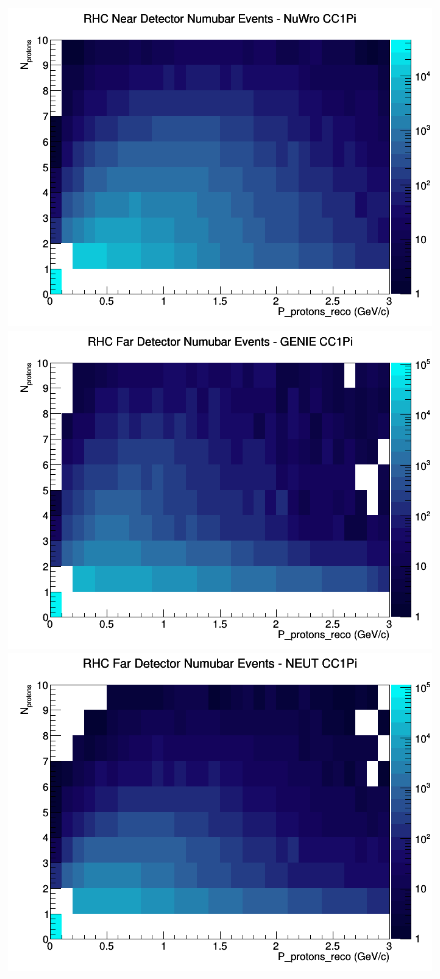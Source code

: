 \begin{figure}[h]
\includegraphics[width=\linewidth]{eff_N_P/LAr/protons/CC1Pi_RHC_ND_numubar_N_P_NuWro.png}
\endminipage
\newline
{}
\includegraphics[width=\linewidth]{eff_N_P/LAr/protons/CC1Pi_RHC_FD_numubar_N_P_GENIE.png}
\endminipage
{}
\includegraphics[width=\linewidth]{eff_N_P/LAr/protons/CC1Pi_RHC_FD_numubar_N_P_NEUT.png}

\end{figure}
